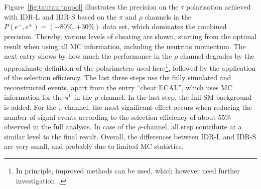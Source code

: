 Figure~\ref{fig:tautau:taupol} illustrates the precision on the $\tau$ polarisation achieved with IDR-L and IDR-S  based on the $\pi$ and $\rho$ channels in the $P(e^-,e^+)=(-80\%,+30\%)$ data set, which dominates the combined precision. Thereby, various
levels of cheating are shown, starting from the optimal result when using all MC information, including the neutrino momentum. The next entry shows by how much the performance in the $\rho$ channel degrades by the approximate definition of the polarimeters used here\footnote{In principle, improved methods can be used, which however need further investigation~\cite{ILDNote:tautau}.}, followed by the application of the selection efficiency. The last three steps use the fully simulated and reconstructed events, apart from the entry ``cheat ECAL'', which uses MC information for the $\pi^0$ in the $\rho$ channel. In the last step, the full SM background is added. For the $\pi$-channel, the most significant effect occurs when reducing the number of signal events according to the selection efficiency of about $55\%$ observed in the full analysis. In case of the $\rho$-channel, all step contribute at a similar level to the final result. Overall, the differences between IDR-L and IDR-S are very small,  and probably due to limited MC statistics. 


